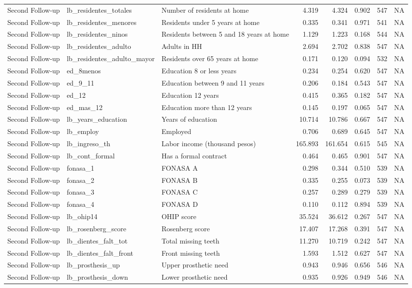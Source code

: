 \begin{table}
\begin{tabular}[t]{lllrrrrr}
Second Follow-up & lb\_residentes\_totales & Number of residents at home & 4.319 & 4.324 & 0.902 & 547 & NA\\
Second Follow-up & lb\_residentes\_menores & Residents under 5 years at home & 0.335 & 0.341 & 0.971 & 541 & NA\\
\addlinespace
Second Follow-up & lb\_residentes\_ninos & Residents between 5 and 18 years at home & 1.129 & 1.223 & 0.168 & 544 & NA\\
Second Follow-up & lb\_residentes\_adulto & Adults in HH & 2.694 & 2.702 & 0.838 & 547 & NA\\
Second Follow-up & lb\_residentes\_adulto\_mayor & Residents over 65 years at home & 0.171 & 0.120 & 0.094 & 532 & NA\\
Second Follow-up & ed\_8menos & Education 8 or less years & 0.234 & 0.254 & 0.620 & 547 & NA\\
Second Follow-up & ed\_9\_11 & Education between 9 and 11 years & 0.206 & 0.184 & 0.543 & 547 & NA\\
\addlinespace
Second Follow-up & ed\_12 & Education 12 years & 0.415 & 0.365 & 0.182 & 547 & NA\\
Second Follow-up & ed\_mas\_12 & Education more than 12 years & 0.145 & 0.197 & 0.065 & 547 & NA\\
Second Follow-up & lb\_years\_education & Years of education & 10.714 & 10.786 & 0.667 & 547 & NA\\
Second Follow-up & lb\_employ & Employed & 0.706 & 0.689 & 0.645 & 547 & NA\\
Second Follow-up & lb\_ingreso\_th & Labor income (thousand pesos) & 165.893 & 161.654 & 0.615 & 545 & NA\\
\addlinespace
Second Follow-up & lb\_cont\_formal & Has a formal contract & 0.464 & 0.465 & 0.901 & 547 & NA\\
Second Follow-up & fonasa\_1 & FONASA A & 0.298 & 0.344 & 0.510 & 539 & NA\\
Second Follow-up & fonasa\_2 & FONASA B & 0.335 & 0.255 & 0.073 & 539 & NA\\
Second Follow-up & fonasa\_3 & FONASA C & 0.257 & 0.289 & 0.279 & 539 & NA\\
Second Follow-up & fonasa\_4 & FONASA D & 0.110 & 0.112 & 0.894 & 539 & NA\\
\addlinespace
Second Follow-up & lb\_ohip14 & OHIP score & 35.524 & 36.612 & 0.267 & 547 & NA\\
Second Follow-up & lb\_rosenberg\_score & Rosenberg score & 17.407 & 17.268 & 0.391 & 547 & NA\\
Second Follow-up & lb\_dientes\_falt\_tot & Total missing teeth & 11.270 & 10.719 & 0.242 & 547 & NA\\
Second Follow-up & lb\_dientes\_falt\_front & Front missing teeth & 1.593 & 1.512 & 0.627 & 547 & NA\\
Second Follow-up & lb\_prosthesis\_up & Upper prosthetic need & 0.943 & 0.946 & 0.656 & 546 & NA\\
\addlinespace
Second Follow-up & lb\_prosthesis\_down & Lower prosthetic need & 0.935 & 0.926 & 0.949 & 546 & NA\\
\bottomrule
\end{tabular}
\end{table}
